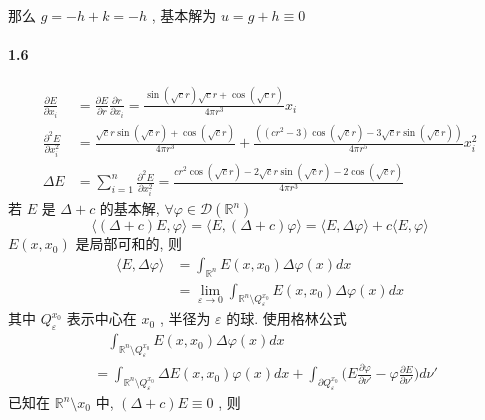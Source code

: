 \documentclass[a4paper, UTF8]{ctexart}				%
\begin{document}
        那么 $g = -h + k = -h$ , 基本解为 $u = g + h \equiv 0$
    \paragraph{1.6}\quad 
        \[
            \begin{split}
                \frac{\partial E}{\partial x_i} & = \frac{\partial E}{\partial r} \frac{\partial r}{\partial x_i} = \frac{\sin (\sqrt{c}r)\sqrt{c}r + \cos (\sqrt{c}r)}{4 \pi r^3}x_i\\
                \frac{\partial^2 E}{\partial x_i^2} & = \frac{\sqrt{c} r \sin \left(\sqrt{c} r\right)+\cos \left(\sqrt{c} r\right)}{4 \pi  r^3}+\frac{\left(\left(c r^2-3\right) \cos \left(\sqrt{c} r\right)-3 \sqrt{c} r \sin \left(\sqrt{c} r\right)\right)}{4 \pi  r^5} x_i^2\\
                \Delta E & = \sum^{n}_{i=1} \frac{\partial^2 E}{\partial x_i^2} = \frac{c r^2 \cos \left(\sqrt{c} r\right)-2 \sqrt{c} r \sin \left(\sqrt{c} r\right)-2 \cos \left(\sqrt{c} r\right)}{4 \pi  r^3} 
            \end{split}
        \]
        若 $E$ 是 $\Delta + c$ 的基本解, $\forall \varphi \in \mathcal{D}(\mathbb{R}^n)$
        \[
            \langle{(\Delta + c)E},{\varphi}\rangle = \langle{E},{(\Delta + c)\varphi}\rangle = \langle{E},{\Delta \varphi}\rangle + c \langle{E},{\varphi}\rangle
        \]
        $E(x,x_0)$ 是局部可和的, 则 
        \[
            \begin{split}
                \langle{E},{\Delta \varphi}\rangle 
                & = \int^{}_{\mathbb{R}^n} E(x,x_0) \Delta \varphi(x) dx\\
                & = \lim_{\varepsilon \rightarrow 0} \int^{}_{\mathbb{R}^n \setminus Q^{x_0}_\varepsilon} E(x,x_0) \Delta \varphi(x) dx
            \end{split}
        \]
        其中 $Q^{x_0}_{\varepsilon}$ 表示中心在 $x_0$ , 半径为 $\varepsilon$ 的球. 使用格林公式 
        \[
            \begin{split}
                & \quad \int^{}_{\mathbb{R}^n \setminus Q^{x_0}_\varepsilon} E(x,x_0) \Delta \varphi(x) dx\\
                & = \int^{}_{\mathbb{R}^n \setminus Q^{x_0}_\varepsilon} \Delta E(x,x_0) \varphi(x) dx 
                + \int^{}_{\partial Q^{x_0}_\varepsilon} \biggl(E \frac{\partial\varphi}{\partial\nu'} - \varphi \frac{\partial E}{\partial\nu'}\biggl)d \nu'
            \end{split}
        \]
        已知在 $\mathbb{R}^n \setminus {x_0}$ 中, $(\Delta + c)E \equiv 0$ , 则
\end{document}

